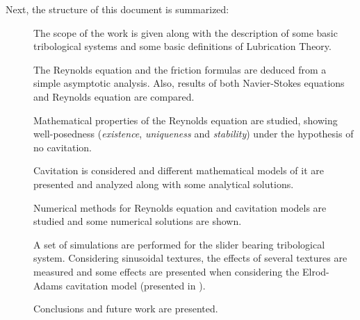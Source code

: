 Next, the structure of this document is summarized:
\begin{description}
\item[] The scope of the work is given along with the description of some basic tribological systems and some basic definitions of Lubrication Theory.
\item[] The Reynolds equation and the friction formulas are deduced from a simple asymptotic analysis. Also, results of both Navier-Stokes equations and Reynolds equation are compared.
\item[] Mathematical properties of the Reynolds equation are studied, showing well-posedness (\emph{existence}, \emph{uniqueness} and \emph{stability}) under the hypothesis of no cavitation.
\item[] Cavitation is considered and different mathematical models of it are presented and analyzed along with some analytical solutions.
\item[] Numerical methods for Reynolds equation and cavitation models are studied and some numerical solutions are shown.
\item[] A set of simulations are performed for the slider bearing tribological system. Considering sinusoidal textures, the effects of several textures are measured and some effects are presented when considering the Elrod-Adams cavitation model (presented in ). 
\item[] Conclusions and future work are presented.
\end{description}

